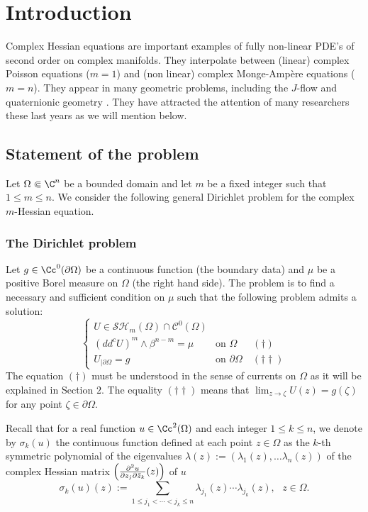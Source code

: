 \section{Introduction}\label{sec:1}

Complex Hessian equations are important examples of fully non-linear PDE's of second order on complex manifolds. They interpolate between (linear) complex \hbox{Poisson} equations ($m = 1$) and (non linear) complex Monge-Ampère equations \hbox{($m=n$)}.
They appear in many geometric problems, including the $J$-flow
\cite{SW} and quaternionic geometry \cite{AV}. They have attracted the attention of many researchers these last years as we will mention below.

\subsection{Statement of the problem}

Let $\Omega \Subset \C^n$ be a bounded domain and let $m$ be a fixed integer such that $1 \leq m \leq n$.
We consider the following general Dirichlet problem for the complex $m$-Hessian equation.

\subsubsection*{The Dirichlet problem} Let $g \in \Cc^{0} (\partial \Omega)$ be a continuous function (the boundary data) and $\mu$ be a positive Borel measure on $\Omega$ (the right hand side). The problem is to find a necessary and sufficient condition on $\mu$ such that the following problem admits a solution:
\begin{equation}\label{eq:DirPb}
\begin{cases}
U \in \mathcal{SH}_m (\Omega) \cap \mathcal {C}^{0} ({\Omega}) \\
(dd^c U)^m \wedge \beta^{n - m} = \mu &\text{on } \Omega\;\;\quad(\dag)\\
U_{\mid \partial \Omega} = g & \text{on } \partial \Omega\quad(\dag \dag)
\end{cases}
\end{equation}
The equation $(\dag)$ must be understood in the sense of currents on $\Omega$ as it will be explained in Section $2$.
The equality $(\dag \dag)$ means that $\lim_{z \to \zeta} U (z) = g (\zeta)$ for any point $\zeta \in \partial \Omega$.

Recall that for a real function $u \in \Cc^2 (\Omega)$ and each integer $1 \leq k \leq n$, we denote by $\sigma_k (u)$ the continuous function defined at each point $z \in \Omega$ as the $k$-th symmetric polynomial of the eigenvalues $\lambda (z):= (\lambda_1 (z),\dots \lambda_n(z))$
of the complex Hessian matrix $\Bigl(\frac{\partial^2 u }{\partial z_j \partial \bar{z}_k} (z)\Bigr)$ of $u$ \ie
\[
\sigma_k (u) (z):= \sum_{1 \leq j_1 < \cdots < j_k \leq n} \lambda_{j_1} (z) \cdots \lambda_{j_k} (z), \, \, \, \, z \in \Omega.
\]

